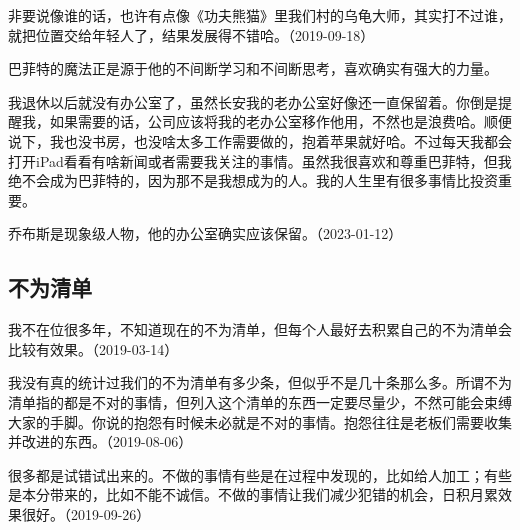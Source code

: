 
非要说像谁的话，也许有点像《功夫熊猫》里我们村的乌龟大师，其实打不过谁，就把位置交给年轻人了，结果发展得不错哈。（2019-09-18）

巴菲特的魔法正是源于他的不间断学习和不间断思考，喜欢确实有强大的力量。

我退休以后就没有办公室了，虽然长安我的老办公室好像还一直保留着。你倒是提醒我，如果需要的话，公司应该将我的老办公室移作他用，不然也是浪费哈。顺便说下，我也没书房，也没啥太多工作需要做的，抱着苹果就好哈。不过每天我都会打开iPad看看有啥新闻或者需要我关注的事情。虽然我很喜欢和尊重巴菲特，但我绝不会成为巴菲特的，因为那不是我想成为的人。我的人生里有很多事情比投资重要。


乔布斯是现象级人物，他的办公室确实应该保留。（2023-01-12）

\subsection{不为清单}


我不在位很多年，不知道现在的不为清单，但每个人最好去积累自己的不为清单会比较有效果。（2019-03-14）


我没有真的统计过我们的不为清单有多少条，但似乎不是几十条那么多。所谓不为清单指的都是不对的事情，但列入这个清单的东西一定要尽量少，不然可能会束缚大家的手脚。你说的抱怨有时候未必就是不对的事情。抱怨往往是老板们需要收集并改进的东西。（2019-08-06）


很多都是试错试出来的。不做的事情有些是在过程中发现的，比如给人加工；有些是本分带来的，比如不能不诚信。不做的事情让我们减少犯错的机会，日积月累效果很好。（2019-09-26）


